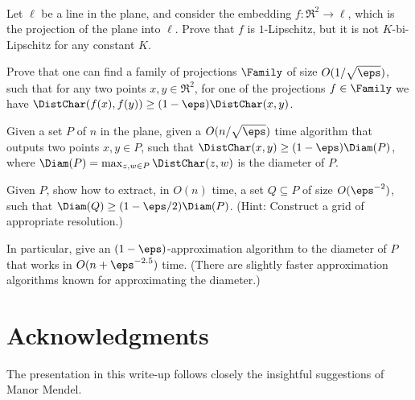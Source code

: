 \begin{exercise}~
    \begin{compactenuma}
        \item {} Let $\ell$ be a line in the plane, and
        consider the embedding $f:\Re^2 \rightarrow \ell$, which is
        the projection of the plane into $\ell$.  Prove that $f$ is
        $1$-Lipschitz, but it is not $K$-bi-Lipschitz for any constant
        $K$.
        
        \item {} Prove that one can find a family of
        projections $\Family$ of size $O(1/\sqrt{\eps})$, such that for any
        two points $x,y \in \Re^2$, for one of the projections $f \in
        \Family$ we have $\DistChar(f(x), f(y)) \geq (1-\eps)\DistChar(x,y)$.
        
        \item {} Given a set $P$ of $n$ in the plane, given
        a $O(n/\sqrt{\eps})$ time algorithm that outputs two points
        $x,y \in P$, such that $\DistChar(x,y) \geq (1-\eps)\Diam(P)$,
        where $\Diam(P) = \max_{z,w\in P} \DistChar(z,w)$ is the
        diameter of $P$.
        
        \item {} Given $P$, show how to extract, in $O(n)$
        time, a set $Q\subseteq P$ of size $O(\eps^{-2})$, such that
        $\Diam(Q)\geq (1-\eps/2)\Diam(P)$. (Hint: Construct a grid of
        appropriate resolution.)
        
        In particular, give an $(1-\eps)$-approximation algorithm to
        the diameter of $P$ that works in $O(n + \eps^{-2.5})$ time.
        (There are slightly faster approximation algorithms known for
        approximating the diameter.)
    \end{compactenuma}
\end{exercise}



\section*{Acknowledgments}

The presentation in this write-up follows closely the insightful
suggestions of Manor Mendel.

% 
%




\ChapterEnd{}



%
